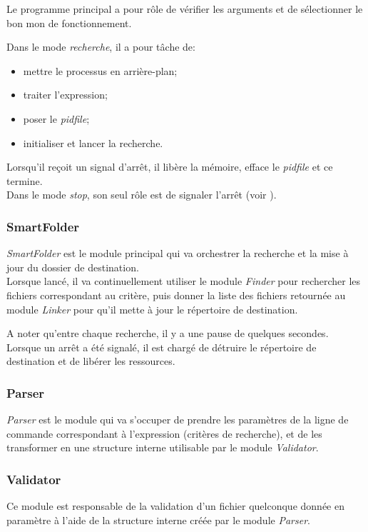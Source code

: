 \documentclass[11pt, a4paper]{article}
\begin{document}
Le programme principal a pour rôle de vérifier les arguments et de sélectionner le bon mon de fonctionnement.

Dans le mode \textit{recherche}, il a pour tâche de:
\begin{itemize}
    \item mettre le processus en arrière-plan;
    \item traiter l'expression;
    \item poser le \textit{pidfile};
    \item initialiser et lancer la recherche.
\end{itemize}

Lorsqu'il reçoit un signal d'arrêt, il libère la mémoire, efface le \textit{pidfile} et ce termine. \\

Dans le mode \textit{stop}, son seul rôle est de signaler l'arrêt (voir ).

\subsubsection{SmartFolder}
\textit{SmartFolder} est le module principal qui va orchestrer la recherche et la mise à jour du dossier de destination. \\

Lorsque lancé, il va continuellement utiliser le module \textit{Finder} pour rechercher les fichiers correspondant au critère,
puis donner la liste des fichiers retournée au module \textit{Linker} pour qu'il mette à jour le répertoire de destination.

A noter qu'entre chaque recherche, il y a une pause de quelques secondes. \\

Lorsque un arrêt a été signalé, il est chargé de détruire le répertoire de destination et de libérer les ressources.

\subsubsection{Parser}
\textit{Parser} est le module qui va s'occuper de prendre les paramètres de la ligne de commande
correspondant à l'expression (critères de recherche), et de les transformer
en une structure interne utilisable par le module \textit{Validator}.

\subsubsection{Validator}
Ce module est responsable de la validation d'un fichier quelconque donnée en paramètre
à l'aide de la structure interne créée par le module \textit{Parser}.
\end{document}
